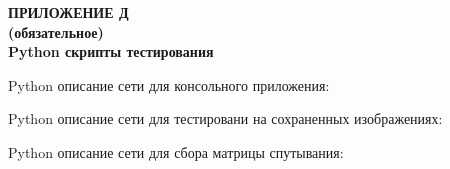 {}%
\par

\normalsize
\begin{center}
  \textbf{ПРИЛОЖЕНИЕ Д} \\
  \textbf{(обязательное)} \\
  \textbf{Python скрипты тестирования}
\end{center}


Python описание сети для консольного приложения:



Python описание сети для тестировани на сохраненных изображениях:



Python описание сети для сбора матрицы спутывания:

